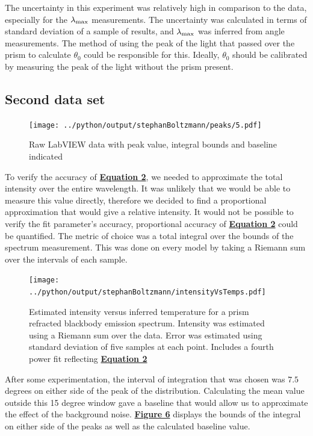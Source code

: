 \documentclass[
	letterpaper
	12pt
]{template}
\newcommand{\bref}[2]{\textbf{\hyperref[#1]{#2}}}
\begin{document}
The uncertainty in this experiment was relatively high in comparison to the data, especially for the $\lambda_{\rm max}$ measurements. The uncertainty was calculated in terms of standard deviation of a sample of results, and $\lambda_{\rm max}$ was inferred from angle measurements. The method of using the peak of the light that passed over the prism to calculate $\theta_0$ could be responsible for this. Ideally, $\theta_0$ should be calibrated by measuring the peak of the light without the prism present.
\newpage\subsection{Second data set}
\begin{figure}\label{fig::expTwoPeaks}
	\vspace{-25pt}
	\texttt{[image: ../python/output/stephanBoltzmann/peaks/5.pdf]}
	\caption{Raw LabVIEW data with peak value, integral bounds and baseline indicated}
	\vspace{-45pt}
\end{figure}
To verify the accuracy of \bref{eqn::stefan}{Equation 2}, we needed to approximate the total intensity over the entire wavelength. It was unlikely that we would be able to measure this value directly, therefore we decided to find a proportional approximation that would give a relative intensity. It would not be possible to verify the fit parameter's accuracy, proportional accuracy of \bref{eqn::stefan}{Equation 2} could be quantified. The metric of choice was a total integral over the bounds of the spectrum measurement. This was done on every model by taking a Riemann sum over the intervals of each sample.\vspace{\baselineskip}


\begin{figure}\label{fig::expTwo}
	\vspace{-20pt}
	\texttt{[image: ../python/output/stephanBoltzmann/intensityVsTemps.pdf]}
	\caption{Estimated intensity versus inferred temperature for a prism refracted blackbody emission spectrum. Intensity was estimated using a Riemann sum over the data. Error was estimated using standard deviation of five samples at each point. Includes a fourth power fit reflecting \bref{eqn::stefan}{Equation 2}}
	\vspace{-20pt}
\end{figure}
After some experimentation, the interval of integration that was chosen was $7.5$ degrees on either side of the peak of the distribution. Calculating the mean value outside this 15 degree window gave a baseline that would allow us to approximate the effect of the background noise. \bref{fig::expTwoPeaks}{Figure 6} displays the bounds of the integral on either side of the peaks as well as the calculated baseline value.\vspace\baselineskip
\end{document}
